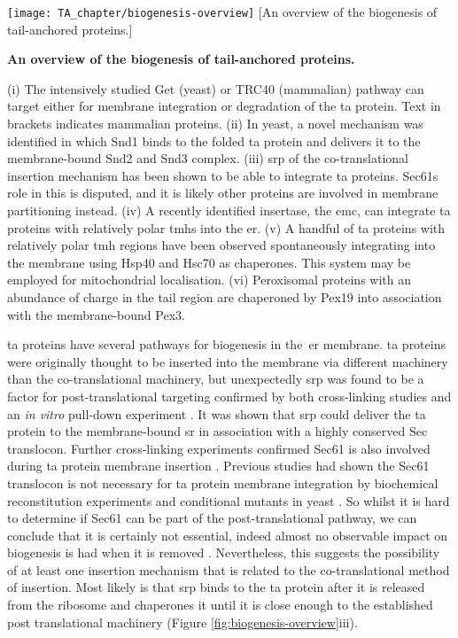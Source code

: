 \begin{sidewaysfigure}
\centering
\texttt{[image: TA\_chapter/biogenesis-overview]}
        [An overview of the biogenesis of tail-anchored proteins.]{\textbf{An overview of the biogenesis of tail-anchored proteins.}

        (i) The intensively studied Get (yeast) or TRC40 (mammalian) pathway can target either for membrane integration or degradation of the \gls{ta} protein.
        Text in brackets indicates mammalian proteins.
        (ii) In yeast, a novel mechanism was identified in which Snd1 binds to the folded \gls{ta} protein and delivers it to the membrane\--bound Snd2 and Snd3 complex.
        (iii) \gls{srp} of the co-translational insertion mechanism has been shown to be able to integrate \gls{ta} proteins. Sec61s role in this is disputed, and it is likely other proteins are involved in membrane partitioning instead.
        (iv) A recently identified insertase, the \gls{emc}, can integrate \gls{ta} proteins with relatively polar \gls{tmh}s into the \gls{er}.
        (v) A handful of \gls{ta} proteins with relatively polar \gls{tmh} regions have been observed spontaneously integrating into the membrane using Hsp40 and Hsc70 as chaperones.
        This system may be employed for mitochondrial localisation.
        (vi) Peroxisomal proteins with an abundance of charge in the tail region are chaperoned by Pex19 into association with the membrane\--bound Pex3.
}

\label{fig:biogenesis-overview}
\end{sidewaysfigure}

\gls{ta} proteins have several pathways for biogenesis in the~\gls{er} membrane.
\gls{ta} proteins were originally thought to be inserted into the membrane via different machinery than the co-translational machinery, but unexpectedly \gls{srp} was found to be a factor for post\--translational targeting confirmed by both cross-linking studies \cite{Abell2004} and an \textit{in vitro} pull-down experiment \cite{Leznicki2010}.
It was shown that \gls{srp} could deliver the \gls{ta} protein to the membrane\--bound \gls{sr} in association with a highly conserved Sec translocon.
Further cross-linking experiments confirmed Sec61 is also involved during \gls{ta} protein membrane insertion \cite{Abell2003}.
Previous studies had shown the Sec61 translocon is not necessary for \gls{ta} protein membrane integration by biochemical reconstitution experiments \cite{Kutay1993} and conditional mutants in yeast \cite{Steel2002, Yabal2003}.
So whilst it is hard to determine if Sec61 can be part of the post\--translational pathway, we can conclude that it is certainly not essential, indeed almost no observable impact on biogenesis is had when it is removed \cite{Kutay1993, Steel2002, Yabal2003}.
Nevertheless, this suggests the possibility of at least one insertion mechanism that is related to the co-translational method of insertion.
Most likely is that \gls{srp} binds to the \gls{ta} protein after it is released from the ribosome and chaperones it until it is close enough to the established post translational machinery \cite{Casson2017} (Figure \ref{fig:biogenesis-overview}iii).


